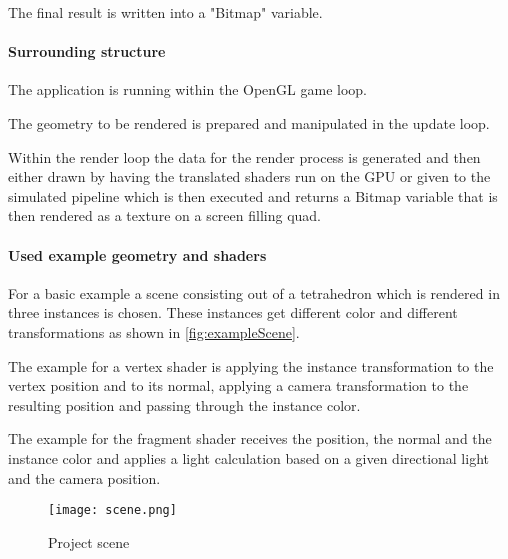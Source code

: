 The final result is written into a "Bitmap" variable.

\paragraph{Surrounding structure}

The application is running within the OpenGL game loop.

The geometry to be rendered is prepared and manipulated in the update loop.

Within the render loop the data for the render process is generated and then either drawn by having the translated shaders run on the GPU or given to the simulated pipeline which is then executed and returns a Bitmap variable that is then rendered as a texture on a screen filling quad.

\paragraph{Used example geometry and shaders}

For a basic example a scene consisting out of a tetrahedron which is rendered in three instances is chosen. These instances get different color and different transformations as shown in  \autoref{fig:exampleScene}.

The example for a vertex shader is applying the instance transformation to the vertex position and to its normal, applying a camera transformation to the resulting position and passing through the instance color.

The example for the fragment shader receives the position, the normal and the instance color and applies a light calculation based on a given directional light and the camera position.

\begin{figure}[h!]
  \centering 
  \texttt{[image: scene.png]}
  \caption[Screenshot of example scene of the project]{Project scene}
  \label{fig:exampleScene}
\end{figure}